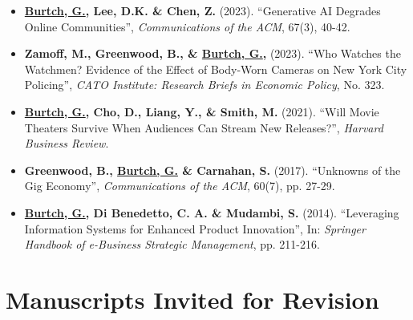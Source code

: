 \documentclass[10.5pt,letterpaper,sans]{moderncv}        %
\begin{document}
\begin{itemize}[leftmargin=!,labelindent=5pt,itemindent=-15pt]

\item \textbf{\underline{Burtch, G.}, Lee, D.K. \& Chen, Z.} (2023). ``Generative AI Degrades Online Communities'', \textit{Communications of the ACM}, 67(3), 40-42.

\item \textbf{Zamoff, M., Greenwood, B., \& \underline{Burtch, G.}, } (2023). ``Who Watches the Watchmen? Evidence of the Effect of Body-Worn Cameras on New York City Policing'', \textit{CATO Institute: Research Briefs in Economic Policy}, No. 323.

\item \textbf{\underline{Burtch, G.}, Cho, D., Liang, Y., \& Smith, M.} (2021). ``Will Movie Theaters Survive When Audiences Can Stream New Releases?'', \textit{Harvard Business Review}.

\item \textbf{Greenwood, B., \underline{Burtch, G.} \& Carnahan, S.} (2017). ``Unknowns of the Gig Economy'', \textit{Communications of the ACM}, 60(7), pp. 27-29.

\item \textbf{\underline{Burtch, G.}, Di Benedetto, C. A. \& Mudambi, S.} (2014). ``Leveraging Information Systems for Enhanced Product Innovation'', In: \textit{Springer Handbook of e-Business Strategic Management}, pp. 211-216.

\end{itemize}

\section{Manuscripts Invited for Revision}
\end{document}
